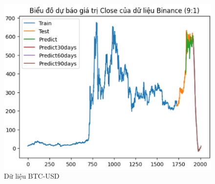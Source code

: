 \documentclass[conference]{IEEEtran}
\begin{document}
\begin{figure}[H]
\begin{minipage}{0.15\textwidth}
			\includegraphics[width=1\textwidth]{Figure/BNB91.png}
		\end{minipage}
		\caption{Dữ liệu BTC-USD}
		\label{fig:1}
	\end{figure}
	
\end{document}
